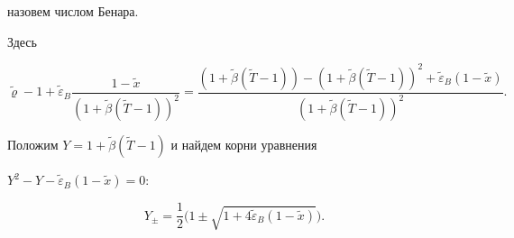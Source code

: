 назовем числом Бенара. 

Здесь

$$

\widetilde{\varrho}-1+\widetilde{\varepsilon}_B

\frac{1- \widetilde{x}}{(1+\widetilde{\beta}(\widetilde{T}-1))^2} 

=\frac{(1+\widetilde{\beta}(\widetilde{T}-1))-

(1+\widetilde{\beta}(\widetilde{T}-1))^2+

\widetilde{\varepsilon}_B

(1- \widetilde{x})}{(1+\widetilde{\beta}(\widetilde{T}-1))^2}.

$$

Положим $Y=1+\widetilde{\beta}(\widetilde{T}-1)$ и найдем корни уравнения

$

Y^2-Y-\widetilde{\varepsilon}_B (1- \widetilde{x} ) =0$:

$$

Y_\pm=\frac12\bigl(1\pm\sqrt{1+4\widetilde{\varepsilon}_B (1- \widetilde{x})}\bigr).

$$



